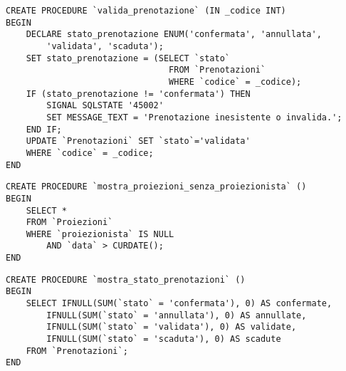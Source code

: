 \pagebreak
\begin{verbatim}
CREATE PROCEDURE `valida_prenotazione` (IN _codice INT)
BEGIN
    DECLARE stato_prenotazione ENUM('confermata', 'annullata',
        'validata', 'scaduta');
    SET stato_prenotazione = (SELECT `stato`
                                FROM `Prenotazioni`
                                WHERE `codice` = _codice);
    IF (stato_prenotazione != 'confermata') THEN
        SIGNAL SQLSTATE '45002'
        SET MESSAGE_TEXT = 'Prenotazione inesistente o invalida.';
    END IF;
    UPDATE `Prenotazioni` SET `stato`='validata'
    WHERE `codice` = _codice;
END
\end{verbatim}

\begin{verbatim}
CREATE PROCEDURE `mostra_proiezioni_senza_proiezionista` ()
BEGIN
    SELECT *
    FROM `Proiezioni`
    WHERE `proiezionista` IS NULL
        AND `data` > CURDATE();
END
\end{verbatim}

\begin{verbatim}
CREATE PROCEDURE `mostra_stato_prenotazioni` ()
BEGIN
    SELECT IFNULL(SUM(`stato` = 'confermata'), 0) AS confermate,
        IFNULL(SUM(`stato` = 'annullata'), 0) AS annullate,
        IFNULL(SUM(`stato` = 'validata'), 0) AS validate,
        IFNULL(SUM(`stato` = 'scaduta'), 0) AS scadute
    FROM `Prenotazioni`;
END
\end{verbatim}
